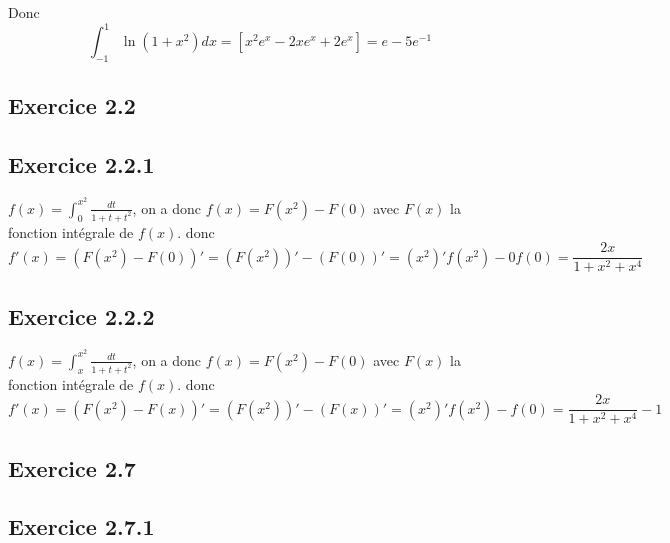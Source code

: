 \documentclass[]{book}
\theoremstyle{definition}
\begin{document}
Donc
$$\int_{-1}^{1}{\ln(1+x^2)dx} = \left[ x^2e^x - 2xe^x + 2e^x \right] = e - 5e^{-1}$$


\subsection*{Exercice 2.2}
\subsection*{Exercice 2.2.1}
$f(x) = \int_{0}^{x^2} {\frac{dt}{1+t+t^2}}$, on a donc $f(x) = F(x^2) - F(0)$ avec $F(x)$ la fonction int\'egrale de $f(x)$. donc
$$
f'(x) = (F(x^2) - F(0))' = (F(x^2))' - (F(0))' = (x^2)'f(x^2) - 0f(0) = \frac{2x}{1+x^2+x^4}
$$


\subsection*{Exercice 2.2.2}
$f(x) = \int_{x}^{x^2} {\frac{dt}{1+t+t^2}}$, on a donc $f(x) = F(x^2) - F(0)$ avec $F(x)$ la fonction int\'egrale de $f(x)$. donc
$$
f'(x) = (F(x^2) - F(x))' = (F(x^2))' - (F(x))' = (x^2)'f(x^2) - f(0) = \frac{2x}{1+x^2+x^4} - 1
$$



\subsection*{Exercice 2.7}
\subsection*{Exercice 2.7.1}
\end{document}
